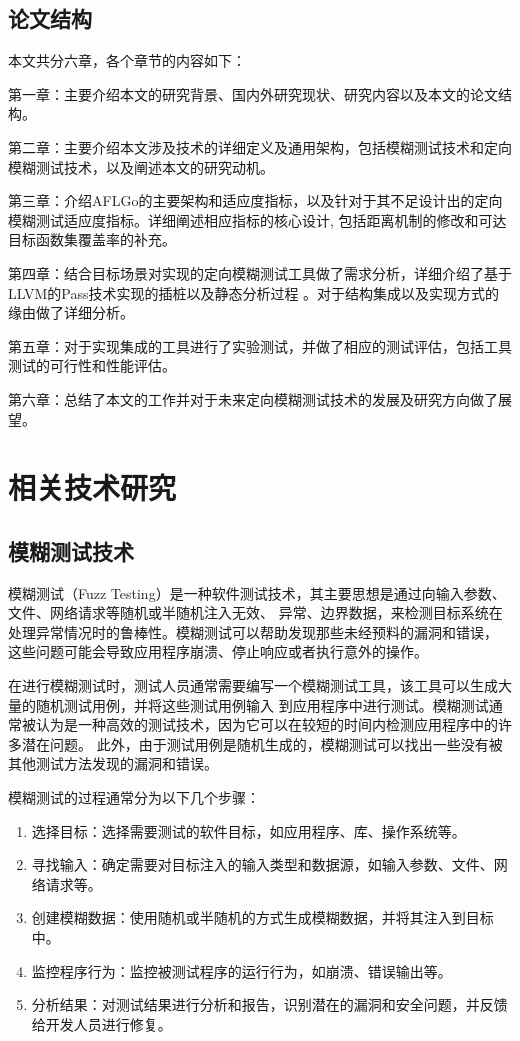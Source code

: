 \documentclass[bachelor]{njupthesis}
\begin{document}
\section{论文结构}
本文共分六章，各个章节的内容如下：

第一章：主要介绍本文的研究背景、国内外研究现状、研究内容以及本文的论文结构。

第二章：主要介绍本文涉及技术的详细定义及通用架构，包括模糊测试技术和定向模糊测试技术，以及阐述本文的研究动机。

第三章：介绍AFLGo的主要架构和适应度指标，以及针对于其不足设计出的定向模糊测试适应度指标。详细阐述相应指标的核心设计,
包括距离机制的修改和可达目标函数集覆盖率的补充。

第四章：结合目标场景对实现的定向模糊测试工具做了需求分析，详细介绍了基于LLVM的Pass技术实现的插桩以及静态分析过程
。对于结构集成以及实现方式的缘由做了详细分析。

第五章：对于实现集成的工具进行了实验测试，并做了相应的测试评估，包括工具测试的可行性和性能评估。

第六章：总结了本文的工作并对于未来定向模糊测试技术的发展及研究方向做了展望。

\chapter{相关技术研究}
\section{模糊测试技术}
模糊测试（Fuzz Testing）是一种软件测试技术，其主要思想是通过向输入参数、文件、网络请求等随机或半随机注入无效、
异常、边界数据，来检测目标系统在处理异常情况时的鲁棒性。模糊测试可以帮助发现那些未经预料的漏洞和错误，
这些问题可能会导致应用程序崩溃、停止响应或者执行意外的操作。

在进行模糊测试时，测试人员通常需要编写一个模糊测试工具，该工具可以生成大量的随机测试用例，并将这些测试用例输入
到应用程序中进行测试。模糊测试通常被认为是一种高效的测试技术，因为它可以在较短的时间内检测应用程序中的许多潜在问题。
此外，由于测试用例是随机生成的，模糊测试可以找出一些没有被其他测试方法发现的漏洞和错误。

模糊测试的过程通常分为以下几个步骤：

\begin{enumerate}[label=(\arabic*)]
	\item 选择目标：选择需要测试的软件目标，如应用程序、库、操作系统等。
	\item 寻找输入：确定需要对目标注入的输入类型和数据源，如输入参数、文件、网络请求等。
	\item 创建模糊数据：使用随机或半随机的方式生成模糊数据，并将其注入到目标中。
	\item 监控程序行为：监控被测试程序的运行行为，如崩溃、错误输出等。
	\item 分析结果：对测试结果进行分析和报告，识别潜在的漏洞和安全问题，并反馈给开发人员进行修复。
\end{enumerate}
\end{document}
